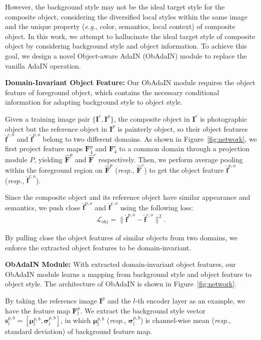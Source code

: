 \documentclass[letterpaper]{article} %
\begin{document}
However, the background style may not be the ideal target style for the composite object, considering the diversified local styles within the same image and the unique property (\emph{e.g.}, color, semantics, local context) of composite object. In this work, we attempt to hallucinate the ideal target style of composite object by considering background style and object information. To achieve this goal, we design a novel Object-aware AdaIN (ObAdaIN) module to replace the vanilla AdaIN operation.

\textbf{Domain-Invariant Object Feature:} Our ObAdaIN module requires the object feature of foreground object, which contains the necessary conditional information for adapting background style to object style.

Given a training image pair $\{\bm{I}^c, \bm{I}^p\}$, the composite object in $\bm{I}^c$ is photographic object but the reference object in $\bm{I}^p$ is painterly object, so their object features $\hat{\bm{f}}^{c,o}$ and $\hat{\bm{f}}^{p,o}$ belong to two different domains. As shown in Figure~\ref{fig:network}, we first project feature maps $\bm{F}^p_4$ and $\bm{F}^c_4$ to a common domain through a projection module $P$, yielding $\hat{\bm{F}}^p$ and $\hat{\bm{F}}^c$ respectively. Then, we perform average pooling within the foreground region on  $\hat{\bm{F}}^p$ (\emph{resp.}, $\hat{\bm{F}}^c$) to get the object feature $\hat{\bm{f}}^{p,o}$ (\emph{resp.}, $\hat{\bm{f}}^{c,o}$).

Since the composite object and its reference object have similar appearance and semantics, we push close $\hat{\bm{f}}^{p,o}$ and $\hat{\bm{f}}^{c,o}$ using the following loss:
\begin{eqnarray}\label{eqn:loss_obj}
\mathcal{L}_{obj} = \|\hat{\bm{f}}^{p,o}-\hat{\bm{f}}^{c,o}\|^2.
\end{eqnarray}

By pulling close the object features of similar objects from two domains,  we enforce the extracted object features to be domain-invariant.

\textbf{ObAdaIN Module: }With extracted domain-invariant object features, our ObAdaIN module learns a mapping from background style and object feature to object style. The architecture of ObAdaIN is shown in Figure~\ref{fig:network}.

By taking the reference image $\bm{I}^p$ and the $l$-th encoder layer as an example, we have the feature map $\bm{F}^p_l$. We extract the background style vector $\bm{s}^{p,b}_l=[\bm{\mu}^{p,b}_l, \bm{\sigma}^{p,b}_l]$, in which $\bm{\mu}^{p,b}_l$ (\emph{resp.}, $\bm{\sigma}^{p,b}_l$) is channel-wise mean (\emph{resp.}, standard deviation) of background feature map.
\end{document}
